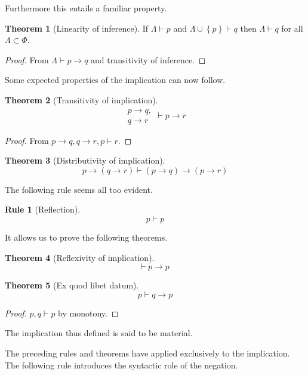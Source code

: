 \documentclass{amsbook}
\newcommand{\setsm}[1]{\left\{#1\right\}}
\newcommand{\infers}{\mathrel\vdash}
\newcommand{\theorem}{\mathord\vdash\medspace}
\newcommand{\then}{\mathrel\rightarrow}
\theoremstyle{definition}
\newtheorem{subrule}{Rule}[subsection]
\newtheorem{thm}{Theorem}[section]
\begin{document}
Furthermore this entails a familiar property.

\begin{thm}[Linearity of inference]
    If $\varLambda \infers p$ and $\varLambda \cup \setsm p \infers q$ then $\varLambda \infers q$ for all $\varLambda \subset \Phi$.
    \begin{proof}
        From $\varLambda \infers p \then q$ and transitivity of inference.
    \end{proof}
\end{thm}

Some expected properties of the implication can now follow.

\begin{thm}[Transitivity of implication]
    $$\begin{aligned}
            p \then q, \\
            q \then r
        \end{aligned} \infers p \then r$$
    \begin{proof}
        From $p \then q, q \then r, p \infers r$.
    \end{proof}
\end{thm}

\begin{thm}[Distributivity of implication]
    $$p \then (q \then r) \infers (p \then q) \then (p \then r)$$
\end{thm}

The following rule seems all too evident.

\begin{subrule}[Reflection]
    $$p \infers p$$
\end{subrule}

It allows us to prove the following theorems.

\begin{thm}[Reflexivity of implication]
    $$\theorem p \then p$$
\end{thm}

\begin{thm}[Ex quod libet datum]
    $$p \infers q \then p$$
    \begin{proof}
        $p, q \infers p$ by monotony.
    \end{proof}
\end{thm}

The implication thus defined is said to be material.

The preceding rules and theorems have applied exclusively to the implication. The following rule introduces the syntactic role of the negation.
\end{document}
